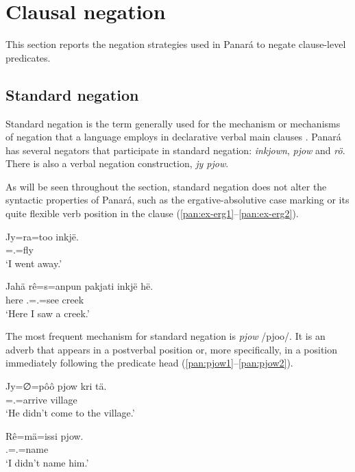 \documentclass[output=paper,colorlinks,citecolor=brown,draft]{langscibook}
\begin{document}
\section{Clausal negation}\label{pan:sec:clausal}

This section reports the negation strategies used in Panará to negate clause-level predicates. 

\subsection{Standard negation}\label{pan:sec:standard}

Standard negation is the term generally used for the mechanism or mechanisms of negation that a language employs in declarative verbal main clauses \citep{Miestamo2005}. Panará has several negators that participate in standard negation: \textit{inkjown}, \textit{pjow} and \textit{rö}. There is also a verbal negation construction, \textit{jy pjow}.

As will be seen throughout the section, standard negation does not alter the syntactic properties of Panará, such as the ergative-absolutive case marking or its quite flexible verb position in the clause (\ref{pan:ex-erg1}--\ref{pan:ex-erg2}).

\ea\label{pan:ex-erg1}
    \gll Jy=ra=too inkjë. \\
    \Intr{}=\Fsg.\Abs{}=fly \Fsg{}  \\
    \glt `I went away.' \\
\z

\ea\label{pan:ex-erg2}
    \gll Jahä rê=s=anpun pakjati inkjë hë. \\
    here \Fsg.\Erg{}=\Tsg.\Abs{}=see creek \Fsg{} \Erg{}  \\
    \glt `Here I saw a creek.' \\
\z

The most frequent mechanism for standard negation is \textit{pjow} /pjoo/. It is an adverb that appears in a postverbal position or, more specifically, in a position immediately following the predicate head (\ref{pan:pjow1}--\ref{pan:pjow2}).

\ea\label{pan:pjow1}
    \gll Jy=∅=pôô pjow kri tä. \\
    \Intr{}=\Tsg.\Abs{}=arrive \Neg{} village \All{} \\
    \glt `He didn't come to the village.' \\
\z

\ea\label{pan:pjow2}
    \gll Rê=mä=issi pjow. \\
    \Fsg{}.\Erg{}=\Tsg.\Dat{}=name \Neg{} \\
    \glt `I didn't name him.' \\
\z
\end{document}
